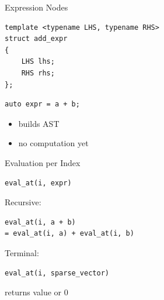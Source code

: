 \documentclass{beamer}
\begin{document}

\begin{frame}[fragile]{Expression Nodes}

\begin{lstlisting}
template <typename LHS, typename RHS>
struct add_expr
{
    LHS lhs;
    RHS rhs;
};
\end{lstlisting}

\vspace{1em}

\begin{lstlisting}
auto expr = a + b;
\end{lstlisting}

\vspace{1em}

\begin{itemize}
\item builds AST
\item no computation yet
\end{itemize}

\end{frame}


\begin{frame}[fragile]{Evaluation per Index}

\begin{lstlisting}
eval_at(i, expr)
\end{lstlisting}

\vspace{1em}

Recursive:

\begin{lstlisting}
eval_at(i, a + b)
= eval_at(i, a) + eval_at(i, b)
\end{lstlisting}

\vspace{1em}

Terminal:

\begin{lstlisting}
eval_at(i, sparse_vector)
\end{lstlisting}

returns value or 0

\end{frame}
\end{document}
